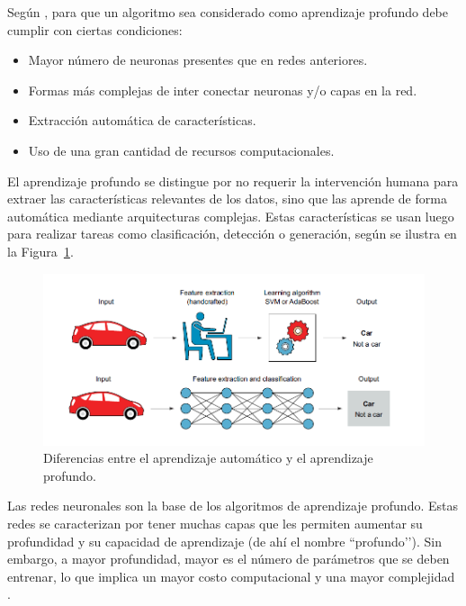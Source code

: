 Según \cite{patterson2017deep}, para que un algoritmo sea considerado como aprendizaje profundo debe cumplir con ciertas condiciones:

\begin{itemize} \item Mayor número de neuronas presentes que en redes anteriores. \item Formas más complejas de inter conectar neuronas y/o capas en la red. \item Extracción automática de características. \item Uso de una gran cantidad de recursos computacionales. \end{itemize}

El aprendizaje profundo se distingue por no requerir la intervención humana para extraer las características relevantes de los datos, sino que las aprende de forma automática mediante arquitecturas complejas. Estas características se usan luego para realizar tareas como clasificación, detección o generación, según se ilustra en la Figura~\ref{fig:comparasion}.

\begin{figure}[H]
    \begin{center}
        \includegraphics[width=1\textwidth]{Images/comparasion.png}
    \end{center}
    \caption{Diferencias entre el aprendizaje automático y el aprendizaje profundo.}
    \label{fig:comparasion}
\end{figure}

Las redes neuronales son la base de los algoritmos de aprendizaje profundo. Estas redes se caracterizan por tener muchas capas que les permiten aumentar su profundidad y su capacidad de aprendizaje (de ahí el nombre ``profundo’'). Sin embargo, a mayor profundidad, mayor es el número de parámetros que se deben entrenar, lo que implica un mayor costo computacional y una mayor complejidad \cite{elgendy2020deep}.

